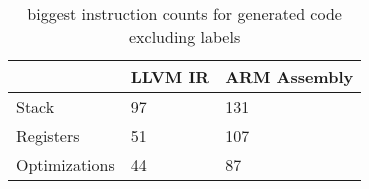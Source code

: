\begin{table}[h!]
\centering
\begin{tabular}{p{}p{}p{}}
  \hline
 & LLVM IR & ARM Assembly \\ 
  \hline
Stack &  97 & 131 \\ 
  Registers &  51 & 107 \\ 
  Optimizations &  44 &  87 \\ 
   \hline
\end{tabular}
\caption{biggest instruction counts for generated code excluding labels}
\end{table}
